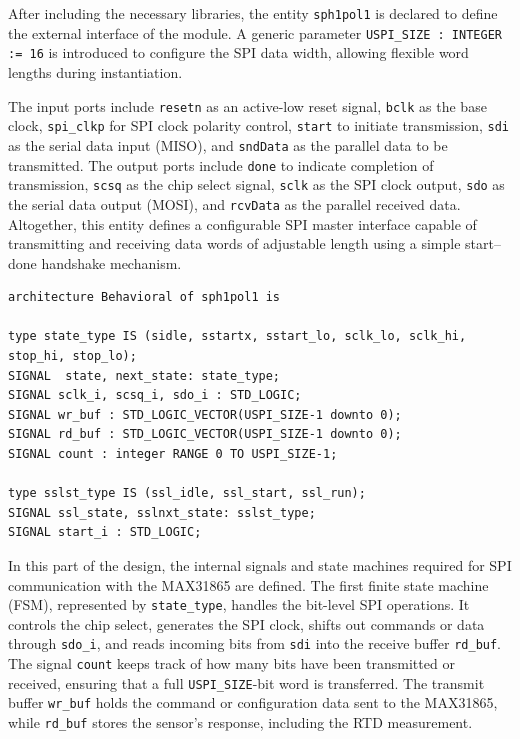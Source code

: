 After including the necessary libraries, the entity \texttt{sph1pol1} is declared to define the external interface of the module. A generic parameter \texttt{USPI\_SIZE : INTEGER := 16} is introduced to configure the SPI data width, allowing flexible word lengths during instantiation.
 
The input ports include \texttt{resetn} as an active-low reset signal, \texttt{bclk} as the base clock, \texttt{spi\_clkp} for SPI clock polarity control, \texttt{start} to initiate transmission, \texttt{sdi} as the serial data input (MISO), and \texttt{sndData} as the parallel data to be transmitted. The output ports include \texttt{done} to indicate completion of transmission, \texttt{scsq} as the chip select signal, \texttt{sclk} as the SPI clock output, \texttt{sdo} as the serial data output (MOSI), and \texttt{rcvData} as the parallel received data. Altogether, this entity defines a configurable SPI master interface capable of transmitting and receiving data words of adjustable length using a simple start--done handshake mechanism.


\begin{verbatim}
architecture Behavioral of sph1pol1 is

type state_type IS (sidle, sstartx, sstart_lo, sclk_lo, sclk_hi, stop_hi, stop_lo);
SIGNAL  state, next_state: state_type;
SIGNAL sclk_i, scsq_i, sdo_i : STD_LOGIC;
SIGNAL wr_buf : STD_LOGIC_VECTOR(USPI_SIZE-1 downto 0);
SIGNAL rd_buf : STD_LOGIC_VECTOR(USPI_SIZE-1 downto 0);
SIGNAL count : integer RANGE 0 TO USPI_SIZE-1;

type sslst_type IS (ssl_idle, ssl_start, ssl_run);
SIGNAL ssl_state, sslnxt_state: sslst_type;
SIGNAL start_i : STD_LOGIC;
\end{verbatim}
In this part of the design, the internal signals and state machines required for SPI communication with the MAX31865 are defined. The first finite state machine (FSM), represented by \texttt{state\_type}, handles the bit-level SPI operations. It controls the chip select, generates the SPI clock, shifts out commands or data through \texttt{sdo\_i}, and reads incoming bits from \texttt{sdi} into the receive buffer \texttt{rd\_buf}. The signal \texttt{count} keeps track of how many bits have been transmitted or received, ensuring that a full \texttt{USPI\_SIZE}-bit word is transferred. The transmit buffer \texttt{wr\_buf} holds the command or configuration data sent to the MAX31865, while \texttt{rd\_buf} stores the sensor's response, including the RTD measurement.

